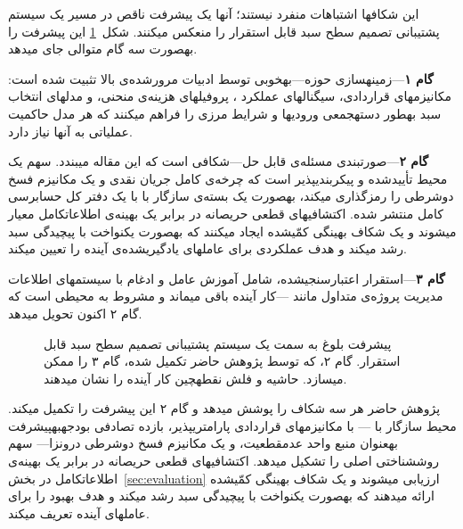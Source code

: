 \medskip
این شکاف\zwnj{}ها اشتباهات منفرد نیستند؛
آن\zwnj{}ها یک پیشرفت ناقص در مسیر
یک سیستم پشتیبانی تصمیم سطح سبد قابل استقرار را منعکس می\zwnj{}کنند.
شکل~\ref{fig:maturity} این پیشرفت را
به\zwnj{}صورت سه گام متوالی جای می\zwnj{}دهد.

\textbf{گام ۱}---زمینه\zwnj{}سازی حوزه---به\zwnj{}خوبی توسط ادبیات
مرورشده‌ی بالا تثبیت شده است:
مکانیزم\zwnj{}های قراردادی، سیگنال\zwnj{}های عملکرد ،
پروفیل\zwnj{}های هزینه‌ی منحنی، و مدل\zwnj{}های انتخاب سبد
به\zwnj{}طور دسته\zwnj{}جمعی ورودی\zwnj{}ها و شرایط مرزی را فراهم می\zwnj{}کنند
که هر مدل حاکمیت عملیاتی به آن\zwnj{}ها نیاز دارد.

\textbf{گام ۲}---صورت\zwnj{}بندی مسئله‌ی قابل حل---شکافی است که
این مقاله می\zwnj{}بندد.
سهم یک محیط  تأییدشده و پیکربندی\zwnj{}پذیر است
که چرخه‌ی کامل جریان نقدی 
و یک مکانیزم فسخ دوشرطی را رمزگذاری می\zwnj{}کند،
به\zwnj{}صورت یک بسته‌ی سازگار با 
با یک دفتر کل حسابرسی  کامل منتشر شده.
اکتشافی\zwnj{}های قطعی حریصانه در برابر یک بهینه‌ی اطلاعات\zwnj{}کامل
معیار می\zwnj{}شوند و یک شکاف بهینگی کمّی\zwnj{}شده ایجاد می\zwnj{}کنند
که به\zwnj{}صورت یکنواخت با پیچیدگی سبد رشد می\zwnj{}کند
و هدف عملکردی برای عامل\zwnj{}های یادگیری\zwnj{}شده‌ی آینده را تعیین می\zwnj{}کند.

\textbf{گام ۳}---استقرار اعتبارسنجی\zwnj{}شده، شامل آموزش عامل 
و ادغام با سیستم\zwnj{}های اطلاعات مدیریت پروژه‌ی متداول
مانند ---کار آینده باقی می\zwnj{}ماند
و مشروط به محیطی است که گام ۲ اکنون تحویل می\zwnj{}دهد.

\begin{figure}[htbp]
    \centering
    
    \caption{پیشرفت بلوغ به سمت یک سیستم پشتیبانی تصمیم سطح سبد
      قابل استقرار.
      گام ۲، که توسط پژوهش حاضر تکمیل شده، گام ۳ را ممکن می\zwnj{}سازد.
      حاشیه و فلش نقطه\zwnj{}چین کار آینده را نشان می\zwnj{}دهند.}
    \label{fig:maturity}
\end{figure}

\medskip
پژوهش حاضر هر سه شکاف را پوشش می\zwnj{}دهد و گام ۲ این پیشرفت را تکمیل می\zwnj{}کند.
محیط  سازگار با ---
با مکانیزم\zwnj{}های قراردادی پارامتری\zwnj{}پذیر،
بازده تصادفی بودجه\zwnj{}به\zwnj{}پیشرفت به\zwnj{}عنوان منبع واحد عدم\zwnj{}قطعیت،
و یک مکانیزم فسخ دوشرطی درون\zwnj{}زا---
سهم روش\zwnj{}شناختی اصلی را تشکیل می\zwnj{}دهد.
اکتشافی\zwnj{}های قطعی حریصانه در برابر یک بهینه‌ی اطلاعات\zwnj{}کامل
در بخش~\ref{sec:evaluation} ارزیابی می\zwnj{}شوند
و یک شکاف بهینگی کمّی\zwnj{}شده ارائه می\zwnj{}دهند که به\zwnj{}صورت یکنواخت
با پیچیدگی سبد رشد می\zwnj{}کند و هدف بهبود را
برای عامل\zwnj{}های  آینده تعریف می\zwnj{}کند.

\begin{table}[htbp]
    \centering
    \caption{آثار نماینده نگاشت\zwnj{}شده در برابر ابعاد مدل\zwnj{}سازی
      چارچوب حاضر.
      \textit{نوع تصمیم}:
      الف\,=\,انتخاب، ز\,=\,زمان\zwnj{}بندی، ب\,=\,بودجه\zwnj{}بندی.
      \checkmark~=~به\zwnj{}طور کامل پوشش\zwnj{}داده\zwnj{}شده؛\;
      $\circ$~=~تا حدی پوشش\zwnj{}داده\zwnj{}شده؛\;
      {--}~=~پوشش\zwnj{}داده\zwnj{}نشده.}
    \label{tab:litmap}
    
\end{table}